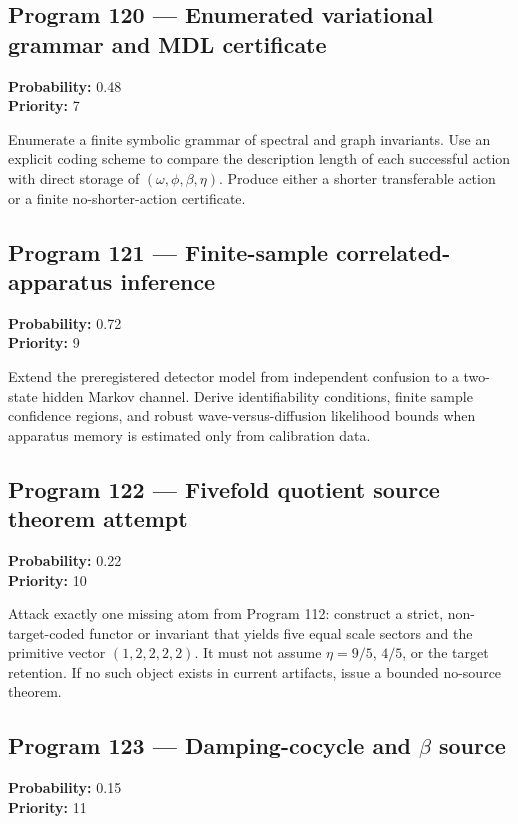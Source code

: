 \documentclass[11pt,a4paper,openany]{report}
\begin{document}
\subsection{Program 120 --- Enumerated variational grammar and MDL certificate}

\textbf{Probability:} 0.48\\
\textbf{Priority:} 7

Enumerate a finite symbolic grammar of spectral and graph invariants. Use an explicit coding scheme to compare the description length of each successful action with direct storage of \((\omega,\phi,\beta,\eta)\). Produce either a shorter transferable action or a finite no-shorter-action certificate.

\subsection{Program 121 --- Finite-sample correlated-apparatus inference}

\textbf{Probability:} 0.72\\
\textbf{Priority:} 9

Extend the preregistered detector model from independent confusion to a two-state hidden Markov channel. Derive identifiability conditions, finite sample confidence regions, and robust wave-versus-diffusion likelihood bounds when apparatus memory is estimated only from calibration data.

\subsection{Program 122 --- Fivefold quotient source theorem attempt}

\textbf{Probability:} 0.22\\
\textbf{Priority:} 10

Attack exactly one missing atom from Program 112: construct a strict, non-target-coded functor or invariant that yields five equal scale sectors and the primitive vector \((1,2,2,2,2)\). It must not assume \(\eta=9/5\), \(4/5\), or the target retention. If no such object exists in current artifacts, issue a bounded no-source theorem.

\subsection{\texorpdfstring{Program 123 --- Damping-cocycle and \(\beta\) source}{Program 123 --- Damping-cocycle and  source}}

\textbf{Probability:} 0.15\\
\textbf{Priority:} 11
\end{document}
